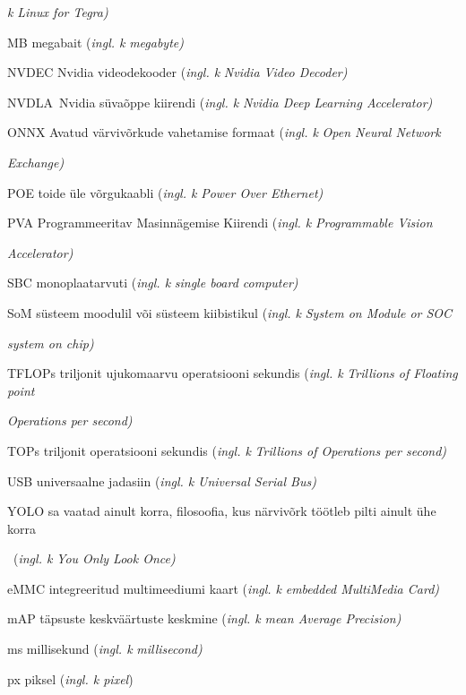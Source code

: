 \emph{k} \emph{Linux for Tegra)}

MB megabait (\emph{ingl. k} \emph{megabyte)}

NVDEC Nvidia videodekooder (\emph{ingl. k} \emph{Nvidia Video Decoder)}

NVDLA~Nvidia süvaõppe kiirendi (\emph{ingl. k} \emph{Nvidia Deep Learning Accelerator)}

ONNX Avatud värvivõrkude vahetamise formaat (\emph{ingl. k} \emph{Open Neural Network}

\emph{Exchange)}

POE toide üle võrgukaabli (\emph{ingl. k} \emph{Power Over Ethernet)}

PVA Programmeeritav Masinnägemise Kiirendi (\emph{ingl. k} \emph{Programmable Vision}

\emph{Accelerator)}

SBC monoplaatarvuti (\emph{ingl. k} \emph{single board computer)}

SoM süsteem moodulil või süsteem kiibistikul (\emph{ingl. k} \emph{System on Module or SOC}

\emph{system on chip)}

TFLOPs triljonit ujukomaarvu operatsiooni sekundis (\emph{ingl. k} \emph{Trillions of Floating point}

\emph{Operations per second)}

TOPs triljonit operatsiooni sekundis (\emph{ingl. k} \emph{Trillions of Operations per second)}

USB universaalne jadasiin (\emph{ingl. k} \emph{Universal Serial Bus)}

YOLO sa vaatad ainult korra, filosoofia, kus närvivõrk töötleb pilti ainult ühe korra

~(\emph{ingl. k} \emph{You Only Look Once)}

eMMC integreeritud multimeediumi kaart (\emph{ingl. k} \emph{embedded MultiMedia Card)}

mAP täpsuste keskväärtuste keskmine (\emph{ingl. k} \emph{mean Average Precision)}

ms millisekund (\emph{ingl. k} \emph{millisecond)}

px piksel (\emph{ingl. k pixel})
